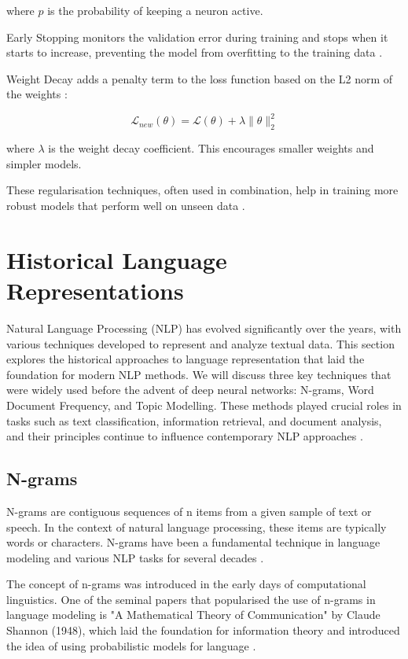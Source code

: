 \documentclass[a4paper, oneside]{discothesis}
\begin{document}
where $p$ is the probability of keeping a neuron active.

Early Stopping monitors the validation error during training and stops when it starts to increase, preventing the model from overfitting to the training data \cite{prechelt1998early}.

Weight Decay adds a penalty term to the loss function based on the L2 norm of the weights \cite{krogh1992simple}:

\begin{equation}
    \mathcal{L}_{new}(\theta) = \mathcal{L}(\theta) + \lambda \|\theta\|_2^2
\end{equation}

where $\lambda$ is the weight decay coefficient. This encourages smaller weights and simpler models.

These regularisation techniques, often used in combination, help in training more robust models that perform well on unseen data \cite{kukavcka2017regularization}.

\section{Historical Language Representations}

Natural Language Processing (NLP) has evolved significantly over the years, with various techniques developed to represent and analyze textual data. This section explores the historical approaches to language representation that laid the foundation for modern NLP methods. We will discuss three key techniques that were widely used before the advent of deep neural networks: N-grams, Word Document Frequency, and Topic Modelling. These methods played crucial roles in tasks such as text classification, information retrieval, and document analysis, and their principles continue to influence contemporary NLP approaches \cite{manning1999foundations}.

\subsection{N-grams}
N-grams are contiguous sequences of n items from a given sample of text or speech. In the context of natural language processing, these items are typically words or characters. N-grams have been a fundamental technique in language modeling and various NLP tasks for several decades \cite{jurafsky2000speech}.

The concept of n-grams was introduced in the early days of computational linguistics. One of the seminal papers that popularised the use of n-grams in language modeling is "A Mathematical Theory of Communication" by Claude Shannon (1948), which laid the foundation for information theory and introduced the idea of using probabilistic models for language \cite{shannon1948mathematical}.
\end{document}
